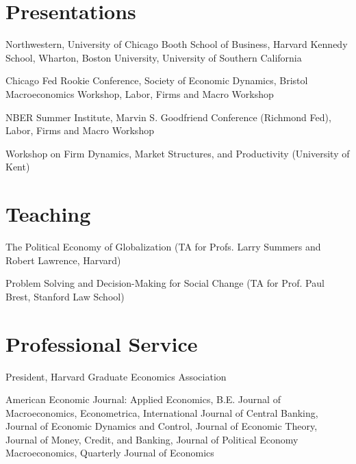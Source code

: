 \documentclass[letterpaper]{article}
\def\footerlink{http://jblevins.org/projects/cv-template/}
\begin{document}
\section*{Presentations}
\begin{description}[labelindent=0pt, labelwidth=1in, labelsep*=1em, leftmargin =!, font=\normalfont]
\item[2024] Northwestern, University of Chicago Booth School of Business, Harvard Kennedy School, Wharton, Boston University, University of Southern California
\item[2023] Chicago Fed Rookie Conference, Society of Economic Dynamics, Bristol Macroeconomics Workshop, Labor, Firms and Macro Workshop
\item[2022] NBER Summer Institute, Marvin S. Goodfriend Conference (Richmond Fed), Labor, Firms and Macro Workshop
\item[2021] Workshop on Firm Dynamics, Market Structures, and Productivity (University of Kent) 
\end{description}

\section*{Teaching}
\begin{description}[labelindent=0pt, labelwidth=1in, labelsep*=1em, leftmargin =!, font=\normalfont]
\item[2021] The Political Economy of Globalization (TA for Profs. Larry Summers and Robert Lawrence, Harvard) 
\item[2015] Problem Solving and Decision-Making for Social Change (TA for Prof. Paul Brest, Stanford Law School)
\end{description}

\section*{Professional Service}
\begin{description}[labelindent=0pt, labelwidth=1in, labelsep*=1em, leftmargin =!, font=\normalfont]
\item[2021--2021] President, Harvard Graduate Economics Association
\item[Refereeing] {American Economic Journal: Applied Economics, B.E. Journal of Macroeconomics, Econometrica, International Journal of Central Banking, Journal of Economic Dynamics and Control, Journal of Economic Theory, Journal of Money, Credit, and Banking, Journal of Political Economy Macroeconomics, Quarterly Journal of Economics}
\end{description}


\end{document}
